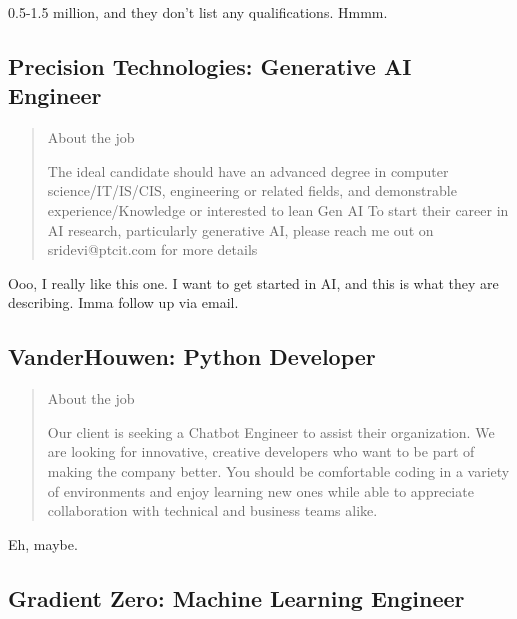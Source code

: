 \documentclass[
	letterpaper, %
	12pt, %
]{CSSullivanBusinessReport}
\begin{document}
0.5-1.5 million, and they don't list any qualifications. Hmmm.


\subsection[Precision Technologies]{Precision Technologies: Generative AI Engineer}

\begin{quote}
	About the job
	
	The ideal candidate should have an advanced degree in computer science/IT/IS/CIS, engineering or related fields, and demonstrable experience/Knowledge or interested to lean Gen AI To start their career in AI research, particularly generative AI, please reach me out on sridevi@ptcit.com for more details

\end{quote}

Ooo, I really like this one. I want to get started in AI, and this is what they are describing. Imma follow up via email.


\subsection[VanderHouwen]{VanderHouwen: Python Developer}

\begin{quote}
	About the job
	
	Our client is seeking a Chatbot Engineer to assist their organization. We are looking for innovative, creative developers who want to be part of making the company better. You should be comfortable coding in a variety of environments and enjoy learning new ones while able to appreciate collaboration with technical and business teams alike.

\end{quote}

Eh, maybe.


\subsection[Gradient Zero]{Gradient Zero: Machine Learning Engineer}
\end{document}
